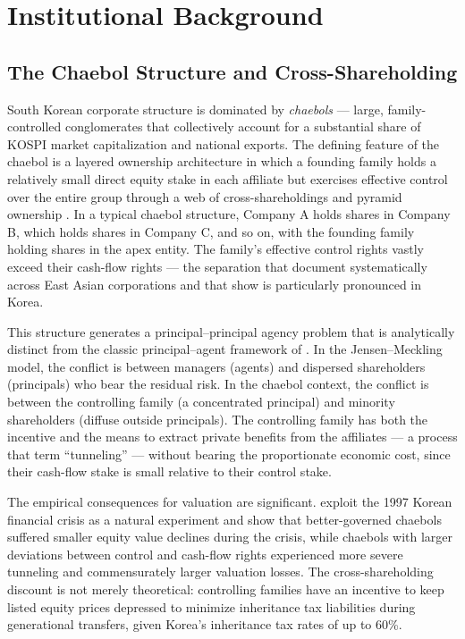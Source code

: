 \documentclass[12pt]{article}
\begin{document}
\section{Institutional Background}
\label{sec:background}

\subsection{The Chaebol Structure and Cross-Shareholding}

South Korean corporate structure is dominated by \textit{chaebols} --- large, family-controlled
conglomerates that collectively account for a substantial share of KOSPI market capitalization
and national exports. The defining feature of the chaebol is a layered ownership architecture
in which a founding family holds a relatively small direct equity stake in each affiliate but
exercises effective control over the entire group through a web of cross-shareholdings and
pyramid ownership \citep{claessens2000}. In a typical chaebol structure, Company A holds
shares in Company B, which holds shares in Company C, and so on, with the founding family
holding shares in the apex entity. The family's effective control rights vastly exceed their
cash-flow rights --- the separation that \citet{claessens2000} document systematically across
East Asian corporations and that \citet{baek2004} show is particularly pronounced in Korea.

This structure generates a principal--principal agency problem that is analytically distinct
from the classic principal--agent framework of \citet{jensen1976}. In the Jensen--Meckling
model, the conflict is between managers (agents) and dispersed shareholders (principals)
who bear the residual risk. In the chaebol context, the conflict is between the controlling
family (a concentrated principal) and minority shareholders (diffuse outside principals). The
controlling family has both the incentive and the means to extract private benefits from the
affiliates --- a process that \citet{baek2004} term ``tunneling'' --- without bearing the
proportionate economic cost, since their cash-flow stake is small relative to their control
stake.

The empirical consequences for valuation are significant. \citet{baek2004} exploit the 1997
Korean financial crisis as a natural experiment and show that better-governed chaebols
suffered smaller equity value declines during the crisis, while chaebols with larger
deviations between control and cash-flow rights experienced more severe tunneling and
commensurately larger valuation losses. The cross-shareholding discount is not merely
theoretical: controlling families have an incentive to keep listed equity prices depressed to
minimize inheritance tax liabilities during generational transfers, given Korea's inheritance
tax rates of up to 60\%.
\end{document}
